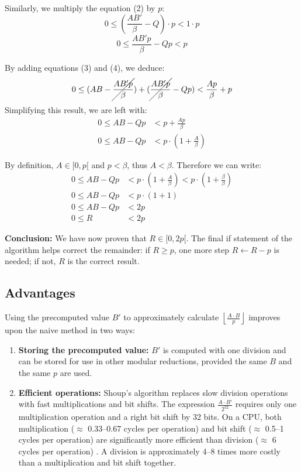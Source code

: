 \documentclass{article}
\newcommand{\pointlabel}[1]{\par\smallskip\noindent\textbf{\textcolor{accentorange}{#1:}} }
\begin{document}
Similarly, we multiply the equation (2) by $p$:
\[0 \le \left( \frac{AB'}{\beta} - Q \right) \cdot p < 1 \cdot p\]
\begin{equation}
    0 \le \frac{AB'p}{\beta} - Qp < p
\end{equation}

By adding equations (3) and (4), we deduce:
\[0 \le (AB - \cancel{\frac{AB'p}{\beta}}) + (\cancel{\frac{AB'p}{\beta}} - Qp) < \frac{Ap}{\beta} + p\]
Simplifying this result, we are left with:
\begin{align*}
    0 \le AB - Qp & < p + \frac{Ap}{\beta}          \\
    0 \le AB - Qp & < p \cdot (1 + \frac{A}{\beta})
\end{align*}

By definition, $A \in [0, p[$ and $p < \beta$, thus $A < \beta$. Therefore we can write:
\begin{align*}
    0 \le AB - Qp & < p \cdot (1 + \frac{A}{\beta}) < p\cdot (1 + \frac{\beta}{\beta}) \\
    0 \le AB - Qp & < p \cdot (1 + 1)                                                  \\
    0 \le AB - Qp & < 2p                                                               \\
    0 \le R       & < 2p
\end{align*}

\pointlabel{Conclusion}
We have now proven that $R \in [0, 2p[$. The final if statement of the algorithm helps correct the remainder: if $R \ge p$, one more step $R\leftarrow R - p$ is needed; if not, $R$ is the correct result.

\newpage
\subsection{Advantages}
Using the precomputed value $B'$ to approximately calculate $\left\lfloor \frac{A \cdot B}{p} \right\rfloor$ improves upon the naive method in two ways:
\begin{enumerate}
    \item \textbf{Storing the precomputed value:}
          $B'$ is computed with one division and can be stored for use in other modular reductions, provided the same $B$ and the same $p$ are used.
    \item \textbf{Efficient operations:}
          Shoup's algorithm replaces slow division operations with fast multiplications and bit shifts. The expression $\frac{A \cdot B'}{2^{32}}$ requires only one multiplication operation and a right bit shift by 32 bits. On a CPU, both multiplication ($\approx$ 0.33--0.67 cycles per operation) and bit shift ($\approx$ 0.5--1 cycles per operation) are significantly more efficient than division ($\approx$ 6 cycles per operation) . A division is approximately 4--8 times more costly than a multiplication and bit shift together. \cite{uopsInfoTable}
\end{enumerate}
\end{document}
